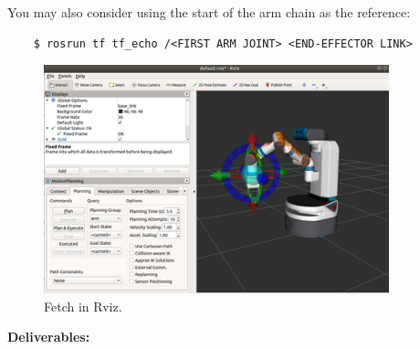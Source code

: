 \documentclass[12pt]{article}
\begin{document}
You may also consider using the start of the arm chain as the reference:

\begin{verbatim}
    $ rosrun tf tf_echo /<FIRST ARM JOINT> <END-EFFECTOR LINK>
\end{verbatim}

\begin{figure}[H]
    \vspace{-10pt}
    \centering\includegraphics[width=10cm]{images/rviz2.png}
    \caption{Fetch in Rviz.}\label{fig:rviz2}\vspace{-10pt}
    \end{figure}

\textbf{Deliverables:}
\end{document}
